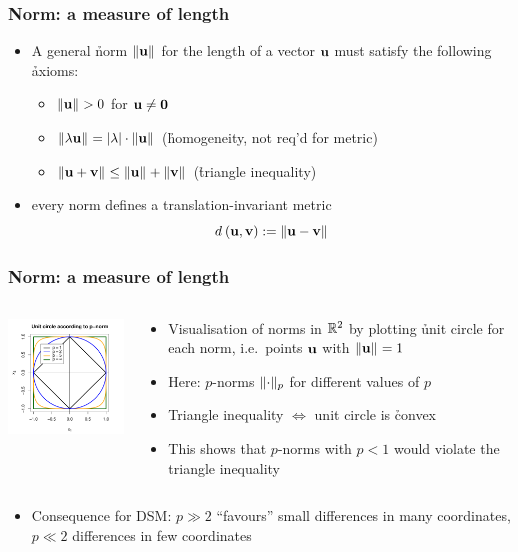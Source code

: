 \begin{frame}
  \frametitle{Norm: a measure of length}

  \begin{itemize}
  \item A general \h{norm} $\norm{\vu}$ for the length of a vector $\vu$ must
    satisfy the following \h{axioms}:
    \begin{itemize}
    \item $\norm{\vu} > 0$ for $\vu \neq \vnull$
    \item $\norm{\lambda\vu} = \abs{\lambda}\cdot \norm{\vu}$
      (\h{homogeneity}, not req'd for metric)
    \item $\norm{\vu + \vv} \leq \norm{\vu} + \norm{\vv}$
      (\h{triangle inequality})
    \end{itemize}
    \pause\gap
  \item every norm defines a translation-invariant metric
    \[ \dist{\vu}{\vv} \coloneq \norm{\vu - \vv} \]
  \end{itemize}
\end{frame}

\begin{frame}
  \frametitle{Norm: a measure of length}

  \begin{columns}[T]
    \begin{column}{50mm}
      \includegraphics[width=50mm]{img/2_p_norms}
    \end{column}
    \begin{column}{50mm}
      \begin{itemize}
       \item Visualisation of norms in $\setR^2$ by plotting \h{unit
           circle} for each norm, i.e.\ points $\vu$ with $\norm{\vu}=1$
       \item Here: $p$-norms $\norm[p]{\cdot}$ for different values of $p$%
         \pause
       \item Triangle inequality $\iff$ unit circle is \h{convex}
       \item This shows that $p$-norms with $p < 1$ would violate the triangle
         inequality
      \end{itemize}
    \end{column}
  \end{columns}
  \pause%
  \begin{itemize}
  \item Consequence for DSM: $p \gg 2$ ``favours'' small differences in many
    coordinates, $p \ll 2$ differences in few coordinates
  \end{itemize}
\end{frame}

